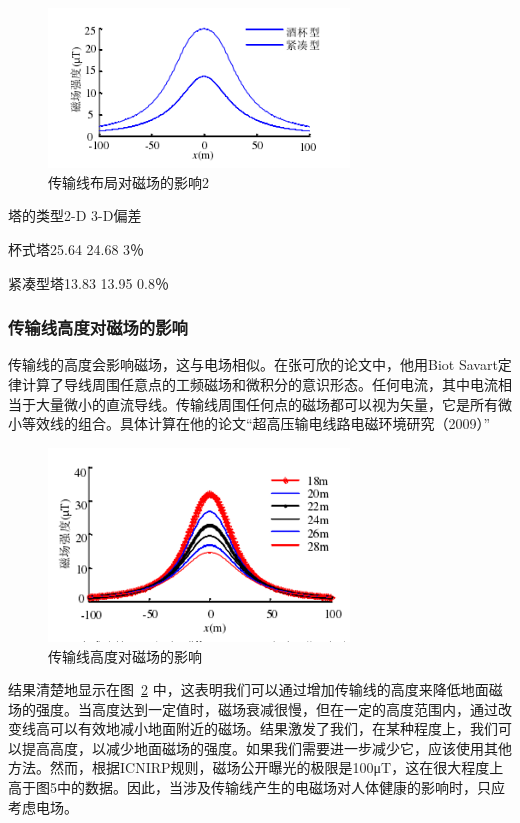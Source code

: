 \documentclass{ctexart} %
\begin{document}
\begin{figure}[htbp]
\small
\centering
\includegraphics[width=8cm]{41.png}
\caption{传输线布局对磁场的影响2} 
\label{41}
\end{figure}

塔的类型2-D 3-D偏差

杯式塔25.64 24.68 3％

紧凑型塔13.83 13.95 0.8％

\subsubsection{传输线高度对磁场的影响}
	
传输线的高度会影响磁场，这与电场相似。在张可欣的论文中，他用Biot Savart定律计算了导线周围任意点的工频磁场和微积分的意识形态。任何电流，其中电流相当于大量微小的直流导线。传输线周围任何点的磁场都可以视为矢量，它是所有微小等效线的组合。具体计算在他的论文“超高压输电线路电磁环境研究（2009）”

\begin{figure}[htbp]
\small
\centering
\includegraphics[width=8cm]{5.png}
\caption{传输线高度对磁场的影响} 
\label{5}
\end{figure}

结果清楚地显示在图~\ref{5}	中，这表明我们可以通过增加传输线的高度来降低地面磁场的强度。当高度达到一定值时，磁场衰减很慢，但在一定的高度范围内，通过改变线高可以有效地减小地面附近的磁场。结果激发了我们，在某种程度上，我们可以提高高度，以减少地面磁场的强度。如果我们需要进一步减少它，应该使用其他方法。然而，根据ICNIRP规则，磁场公开曝光的极限是100μT，这在很大程度上高于图5中的数据。因此，当涉及传输线产生的电磁场对人体健康的影响时，只应考虑电场。
\end{document}
